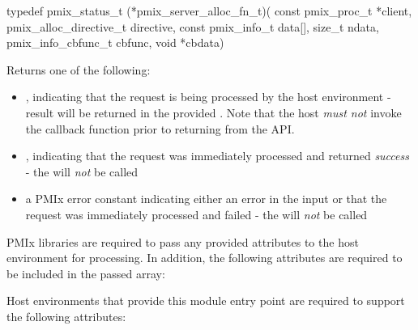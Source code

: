 \format

\cspecificstart
\begin{codepar}
typedef pmix_status_t (*pmix_server_alloc_fn_t)(
                             const pmix_proc_t *client,
                             pmix_alloc_directive_t directive,
                             const pmix_info_t data[], size_t ndata,
                             pmix_info_cbfunc_t cbfunc, void *cbdata)
\end{codepar}
\cspecificend

\begin{arglist}
\end{arglist}

Returns one of the following:

\begin{itemize}
    \item {}, indicating that the request is being processed by the host environment - result will be returned in the provided . Note that the host \emph{must not} invoke the callback function prior to returning from the \ac{API}.
    \item {}, indicating that the request was immediately processed and returned \textit{success} - the  will \textit{not} be called
    \item a PMIx error constant indicating either an error in the input or that the request was immediately processed and failed - the  will \textit{not} be called
\end{itemize}

\reqattrstart
\ac{PMIx} libraries are required to pass any provided attributes to the host environment for processing. In addition, the following attributes are required to be included in the passed  array:


Host environments that provide this module entry point are required to support the following attributes:

